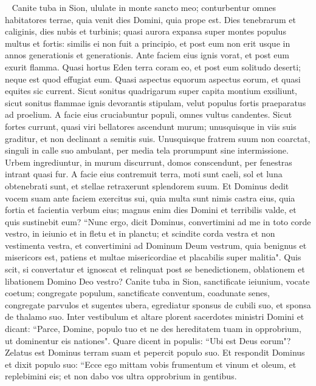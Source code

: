 \begin{biblechapter}   
\verse Canite tuba in Sion, ululate in monte sancto meo; conturbentur omnes habitatores terrae, quia venit dies Domini, quia prope est. 
\verse Dies tenebrarum et caliginis, dies nubis et turbinis; quasi aurora expansa super montes populus multus et fortis: similis ei non fuit a principio, et post eum non erit usque in annos generationis et generationis. 
\verse Ante faciem eius ignis vorat, et post eum exurit flamma. Quasi hortus Eden terra coram eo, et post eum solitudo deserti; neque est quod effugiat eum. 
\verse Quasi aspectus equorum aspectus eorum, et quasi equites sic current. 
\verse Sicut sonitus quadrigarum super capita montium exsiliunt, sicut sonitus flammae ignis devorantis stipulam, velut populus fortis praeparatus ad proelium. 
\verse A facie eius cruciabuntur populi, omnes vultus candentes. 
\verse Sicut fortes currunt, quasi viri bellatores ascendunt murum; unusquisque in viis suis graditur, et non declinant a semitis suis. 
\verse Unusquisque fratrem suum non coarctat, singuli in calle suo ambulant, per media tela prorumpunt sine intermissione. 
\verse Urbem ingrediuntur, in murum discurrunt, domos conscendunt, per fenestras intrant quasi fur. 
\verse A facie eius contremuit terra, moti sunt caeli, sol et luna obtenebrati sunt, et stellae retraxerunt splendorem suum. 
\verse Et Dominus dedit vocem suam ante faciem exercitus sui, quia multa sunt nimis castra eius, quia fortia et facientia verbum eius; magnus enim dies Domini et terribilis valde, et quis sustinebit eum? 
\verse “Nunc ergo, dicit Dominus, convertimini ad me in toto corde vestro, in ieiunio et in fletu et in planctu; 
\verse et scindite corda vestra et non vestimenta vestra, et convertimini ad Dominum Deum vestrum, quia benignus et misericors est, patiens et multae misericordiae et placabilis super malitia". 
\verse Quis scit, si convertatur et ignoscat et relinquat post se benedictionem, oblationem et libationem Domino Deo vestro? 
\verse Canite tuba in Sion, sanctificate ieiunium, vocate coetum; congregate populum, sanctificate conventum, coadunate senes, 
\verse congregate parvulos et sugentes ubera, egrediatur sponsus de cubili suo, et sponsa de thalamo suo. 
\verse Inter vestibulum et altare plorent sacerdotes ministri Domini et dicant: “Parce, Domine, populo tuo et ne des hereditatem tuam in opprobrium, ut dominentur eis nationes". Quare dicent in populis: “Ubi est Deus eorum"? 
\verse Zelatus est Dominus terram suam et pepercit populo suo. 
\verse Et respondit Dominus et dixit populo suo: “Ecce ego mittam vobis frumentum et vinum et oleum, et replebimini eis; et non dabo vos ultra opprobrium in gentibus. 

\end{biblechapter}
